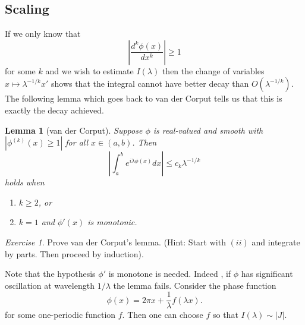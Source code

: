 \documentclass[11pt]{article}
\newtheorem{lem}[thm]{Lemma}
\theoremstyle{remark}
\newtheorem{exr}{Exercise}
\newcommand{\1}{\textbf{1}}
\begin{document}
\subsection*{Scaling}
If we only know that
\[
\left| \frac{d^k \phi(x)}{dx^k} \right| \geq 1
\]
for some $k$ and we wish to estimate $I(\lambda)$ then the change of variables $x \mapsto \lambda^{-1/k} x'$ shows that the integral cannot have better decay than $O(\lambda^{-1/k})$. The following lemma which goes back to van der Corput tells us that this is exactly the decay achieved.
\begin{lem}[van der Corput]
Suppose $\phi$ is real-valued and smooth with $|\phi^{(k)}(x) \geq 1|$ for all $x \in (a,b)$. Then
\[
\left|\int_a^b e^{i \lambda \phi(x)} dx \right| \leq c_k \lambda^{-1/k}
\]
holds when
\begin{enumerate}
\item[(i)] $k \geq 2$, or
\item[(ii)] $k = 1$ and $\phi'(x)$ is monotonic.
\end{enumerate}
\end{lem}
\begin{exr}
Prove van der Corput's lemma. (Hint: Start with $(ii)$ and integrate by parts. Then proceed by induction).
\end{exr}
Note that the hypothesis $\phi'$ is monotone is needed. Indeed , if $\phi$ has significant oscillation at wavelength $1/\lambda$ the lemma fails. Consider the phase function
\[
\phi(x) = 2 \pi x + \frac{1}{\lambda} f( \lambda x).
\]
for some one-periodic function $f$. Then one can choose $f$ so that $I(\lambda) \sim |J|$.
\end{document}
